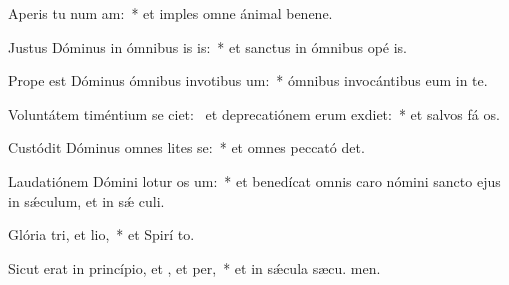 \item Aperis tu num am:~* et imples omne ánimal benene.
\item Justus Dóminus in ómnibus is is:~* et sanctus in ómnibus opé is.
\item Prope est Dóminus ómnibus invotibus um:~* ómnibus invocántibus eum in te.
\item Voluntátem timéntium se ciet:~\pscross{} et deprecatiónem erum exdiet:~* et salvos fá os.
\item Custódit Dóminus omnes lites se:~* et omnes peccató det.
\item Laudatiónem Dómini lotur os um:~* et benedícat omnis caro nómini sancto ejus in sǽculum, et in sǽ culi.
\item Glória tri, et lio,~* et Spirí to.
\item Sicut erat in princípio, et , et per,~* et in sǽcula sæcu. men.
